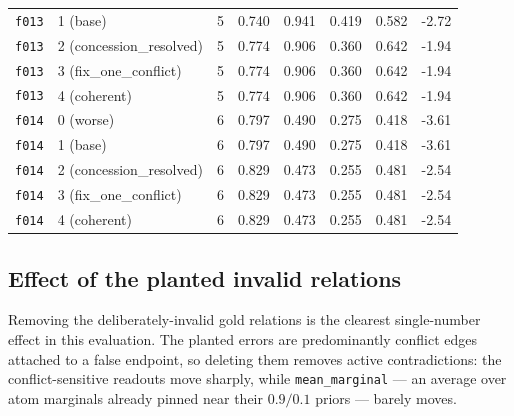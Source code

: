 \documentclass[11pt]{article}
\begin{document}
\begin{table}[htbp]
\begin{tabular}{llrrrrrr}
\texttt{f013} & 1 (base) & 5 & 0.740 & 0.941 & 0.419 & 0.582 & -2.72 \\
\texttt{f013} & 2 (concession\_resolved) & 5 & 0.774 & 0.906 & 0.360 & 0.642 & -1.94 \\
\texttt{f013} & 3 (fix\_one\_conflict) & 5 & 0.774 & 0.906 & 0.360 & 0.642 & -1.94 \\
\texttt{f013} & 4 (coherent) & 5 & 0.774 & 0.906 & 0.360 & 0.642 & -1.94 \\
\midrule
\texttt{f014} & 0 (worse) & 6 & 0.797 & 0.490 & 0.275 & 0.418 & -3.61 \\
\texttt{f014} & 1 (base) & 6 & 0.797 & 0.490 & 0.275 & 0.418 & -3.61 \\
\texttt{f014} & 2 (concession\_resolved) & 6 & 0.829 & 0.473 & 0.255 & 0.481 & -2.54 \\
\texttt{f014} & 3 (fix\_one\_conflict) & 6 & 0.829 & 0.473 & 0.255 & 0.481 & -2.54 \\
\texttt{f014} & 4 (coherent) & 6 & 0.829 & 0.473 & 0.255 & 0.481 & -2.54 \\
\bottomrule
\end{tabular}
\end{table}

\subsection{Effect of the planted invalid relations}

Removing the deliberately-invalid gold relations is the clearest single-number effect in this evaluation. The planted errors are predominantly conflict edges attached to a false endpoint, so deleting them removes active contradictions: the conflict-sensitive readouts move sharply, while \texttt{mean\_marginal} --- an average over atom marginals already pinned near their $0.9/0.1$ priors --- barely moves.
\end{document}
